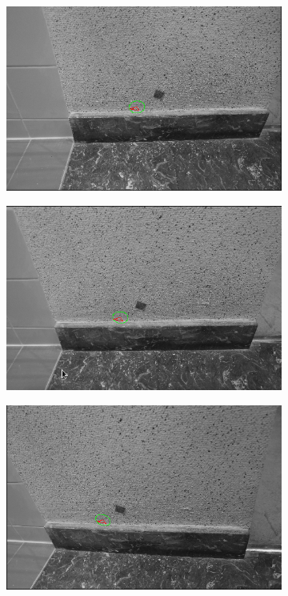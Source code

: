 \begin{enumerate}
\begin{figure}
\begin{subfigure}[b]{0.16\textwidth}
                \includegraphics[width=\linewidth]{FIGS/TaskCorrel/EllipseAffine/imgA.png}
        \end{subfigure}%
        	\hfill
        \begin{subfigure}[b]{0.16\textwidth}
                \includegraphics[width=\linewidth]{FIGS/TaskCorrel/EllipseAffine/imgB.png}
        \end{subfigure}%
                \hfill
        \begin{subfigure}[b]{0.16\textwidth}
                \includegraphics[width=\linewidth]{FIGS/TaskCorrel/EllipseAffine/imgC.png}

\end{subfigure}
\end{figure}
\end{enumerate}
